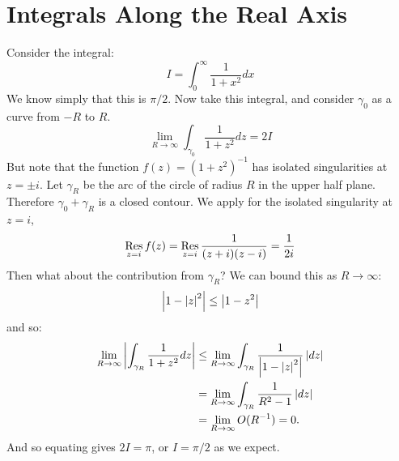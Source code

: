 \documentclass[../Main.tex]{subfiles}
\begin{document}
\section{Integrals Along the Real Axis}
\begin{example}
    Consider the integral:
    \begin{equation*}
        I = \int_{0}^{\infty} \frac{1}{1 + x^2} dx
    \end{equation*}
    We know simply that this is $\pi / 2$. Now take this integral, and consider $\gamma_0$ as a curve from $-R$ to $R$.
    \begin{equation*}
        \lim_{R \to \infty} \int_{\gamma_0} \frac{1}{1 + z^2} dz = 2I
    \end{equation*}
    But note that the function $f(z) = (1 + z^2)^{-1}$ has isolated singularities at $z = \pm i$. Let $\gamma_R$ be the arc of the circle of radius $R$ in the upper half plane. Therefore $\gamma_0 + \gamma_R$ is a closed contour. We apply  for the isolated singularity at $z = i$,
    \begin{equation*}
        \operatorname*{Res}_{z = i} f(z) = \operatorname*{Res}_{z = i} \frac{1}{(z + i)(z - i)} = \frac{1}{2i}
    \end{equation*}
    Then what about the contribution from $\gamma_R$? We can bound this as $R \to \infty$:
    \begin{equation*}
        \left|1 - \left|z\right|^2\right| \leq \left|1 - z^2\right|
    \end{equation*}
    and so:
    \begin{align*}
        \lim_{R \to \infty} \left|\int_{\gamma_R} \frac{1}{1 + z^2} dz\right| &\leq \lim_{R \to \infty} \int_{\gamma_R} \frac{1}{\left|1 - \left|z\right|^2\right|} \left|dz\right| \\
        &= \lim_{R \to \infty} \int_{\gamma_R} \frac{1}{R^2 - 1} \left|dz\right| \\
        &= \lim_{R \to \infty} O(R^{-1}) = 0.
    \end{align*}
    And so equating gives $2I = \pi$, or $I = \pi / 2$ as we expect.
\end{example}
\end{document}

